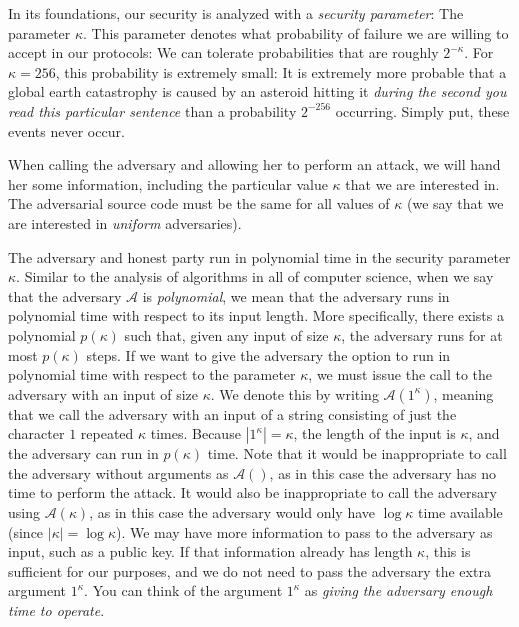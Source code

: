 In its foundations, our security is analyzed with a \emph{security parameter}:
The parameter
$\kappa$. This parameter denotes what probability of failure we are willing to accept
in our protocols: We can tolerate probabilities that are roughly $2^{-\kappa}$. For
$\kappa = 256$, this probability is extremely small: It is extremely more probable that
a global
earth catastrophy is caused by an asteroid hitting it \emph{during the second you
read this particular sentence} than a probability $2^{-256}$ occurring. Simply put,
these events never occur.

When calling the adversary and allowing her to perform an attack, we will hand her
some information, including the particular value $\kappa$ that we are interested in.
The adversarial source code must be the same for all values of $\kappa$ (we say that we are
interested in \emph{uniform} adversaries).

The adversary and honest party run in polynomial time in the security parameter
$\kappa$. Similar to the analysis of algorithms in all of computer science,
when we say that the adversary $\mathcal{A}$ is \emph{polynomial}, we mean that the
adversary runs in polynomial time with respect to its input length. More specifically, there exists
a polynomial $p(\kappa)$ such that, given any input of size $\kappa$, the adversary runs for
at most $p(\kappa)$ steps. If we want to give the
adversary the option to run in polynomial time with respect to the parameter $\kappa$, we must
issue the call to the adversary with an input of size $\kappa$. We denote this by writing
$\mathcal{A}(1^\kappa)$, meaning that we call the adversary with an input of a string consisting
of just the character $1$ repeated $\kappa$ times. Because $|1^\kappa| = \kappa$, the length of
the input is $\kappa$, and the adversary can run in $p(\kappa)$ time. Note that it would be
inappropriate to call the adversary without arguments as $\mathcal{A}()$, as in this case the
adversary has no time to perform the attack. It would also be inappropriate to call the adversary
using $\mathcal{A}(\kappa)$, as in this case the adversary would only have $\log\kappa$ time
available (since $|\kappa| = \log\kappa$). We may have more information to pass to the adversary
as input, such as a public key. If that information already has length $\kappa$, this is sufficient
for our purposes, and we do not need to pass the adversary the extra argument $1^\kappa$. You
can think of the argument $1^\kappa$ as \emph{giving the adversary enough time to operate}.

